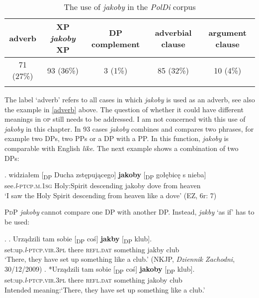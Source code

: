 \documentclass[output=paper
,modfonts
,nonflat]{langsci/langscibook}
\newcommand{\glossformat}[1]{\textsc{#1}}
\newcommand{\firstperson}{\glossformat{1}\xspace}
\newcommand{\thirdperson}{\glossformat{3}\xspace}
\newcommand{\dat}{\glossformat{dat}\xspace}
\newcommand{\lptcp}{\emph{l}\glossformat{-ptcp}\xspace}
\newcommand{\masc}{\glossformat{m}\xspace}
\newcommand{\pl}{\glossformat{pl}\xspace}
\newcommand{\refl}{\glossformat{refl}\xspace}
\newcommand{\sg}{\glossformat{sg}\xspace}
\newcommand{\vir}{\glossformat{vir}\xspace}
\newcommand{\nquelle}[1]{\newline\phantom{x}\hfill(#1)}
\begin{document}
\begin{table}[h] \center \begin{tabular}{ccccc} 
 \lsptoprule
adverb & XP \emph{jakoby} XP & DP complement  & \newline adverbial clause & argument clause \\
\midrule
 71 (27\%) & 93 (36\%) & 3 (1\%) & 85 (32\%) & 10 (4\%)  \\
 \lspbottomrule
\end{tabular}
\caption{The use of \emph{jakoby} in the \emph{PolDi} corpus} \label{staropolski_statystka}
\end{table}

\noindent The label `adverb' refers to all cases in which \emph{jakoby} is used as an adverb, see also the example in \ref{adverb} above. The question of whether it could have different meanings in \textsc{op} still needs to be addressed. I am not concerned with this use of \emph{jakoby} in this chapter. In 93 cases \emph{jakoby} combines and compares two phrases, for example two DPs, two PPs or a DP with a PP. In this function, \emph{jakoby} is comparable with English \emph{like}. The next example shows a combination of two DPs: 

\exg.		widziałem [\textsubscript{DP} Ducha zstępującego] \textbf{jakoby} [\textsubscript{DP} gołębicę s nieba] \label{pingwin} \\
		see.{\lptcp}.{\masc}.{\firstperson}{\sg} {} {Holy:Spirit} descending jakoby {} dove from heaven \\
		`I saw the Holy Spirit descending from heaven like a dove' \nquelle{EZ, 6r: 7}	

\textsc{PdP} \emph{jakoby} cannot compare one DP with another DP. Instead, \emph{jakby} `as if' has to be used:

\ex.	\ag.	Urządzili tam sobie [\textsubscript{DP} coś] \textbf{jakby} \hspace{1,0cm} [\textsubscript{DP} klub]. \\
		set:up.{\lptcp}.{\vir}.{\thirdperson}{\pl} there {\refl}.{\dat} {} something jakby {} {} club \\ 
		`There, they have set up something like a club.' \nquelle{NKJP, \emph{Dziennik Zachodni}, 30/12/2009}    
	\bg.	*Urządzili tam sobie [\textsubscript{DP} coś] \textbf{jakoby} \hspace{1,0cm} [\textsubscript{DP} klub]. \\
		set:up.{\lptcp}.{\vir}.{\thirdperson}{\pl} there {\refl}.{\dat} {} something jakoby {} {} club \\ 
		Intended meaning:`There, they have set up something like a club.'	       
\end{document}
